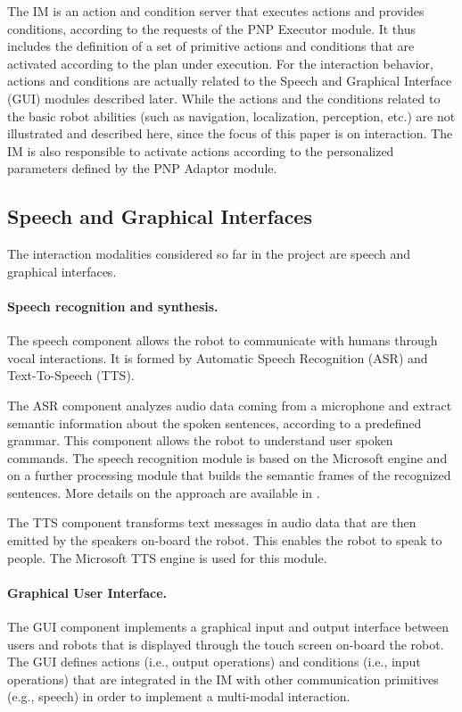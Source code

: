 The IM is an action and condition server that executes actions and provides conditions, according to the requests of the PNP Executor module. It thus includes the definition of a set of primitive actions and conditions that are activated according to the plan under execution.
For the interaction behavior, actions and conditions are actually related to the Speech and Graphical Interface (GUI) modules described later. While the actions and the conditions related to the basic robot abilities (such as navigation, localization, perception, etc.) are not illustrated and described here, since the focus of this paper is on interaction.
The IM is also responsible to activate actions according to the personalized parameters defined by the PNP Adaptor module.

\subsection{Speech and Graphical Interfaces}

The interaction modalities considered so far in the project are speech and graphical interfaces.

\paragraph{Speech recognition and synthesis.}
The speech component allows the robot to communicate with humans through vocal interactions. 
It is formed by Automatic Speech Recognition (ASR) and Text-To-Speech (TTS).

The ASR component analyzes audio data coming from a microphone and extract semantic information about the spoken sentences, according to a predefined grammar. This component allows the robot to understand user spoken commands.
The speech recognition module is based on the Microsoft engine and on a further processing module that builds the semantic frames of the recognized sentences.
More details on the approach are available in \cite{BastianelliCCBN14}.

The TTS component transforms text messages in audio data that are then emitted by the speakers on-board the robot. This enables the robot to speak to people. The Microsoft TTS engine is used for this module.


\paragraph{Graphical User Interface.}

The GUI component implements a graphical input and output interface between users and robots that is displayed through the touch screen on-board the robot. The GUI defines actions (i.e., output operations) and conditions (i.e., input operations) that are integrated in the IM with other communication primitives (e.g., speech) in order to implement a multi-modal interaction.

